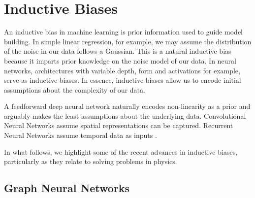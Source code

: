\documentclass{article}
\begin{document}
\section{Inductive Biases}

An inductive bias in machine learning is prior information used to guide model building. In simple linear regression, for example, we may assume the distribution of the noise in our data follows a Gaussian. This is a natural inductive bias because it imparts prior knowledge on the noise model of our data. In neural networks, architectures with variable depth, form and activations for example, serve as inductive biases. In essence, inductive biases allow us to encode initial assumptions about the complexity of our data.

A feedforward deep neural network naturally encodes non-linearity as a prior and arguably makes the least assumptions about the underlying data. Convolutional Neural Networks assume spatial representations can be captured. Recurrent Neural Networks assume temporal data as inputs \cite{battaglia_relational_2018}.

In what follows, we highlight some of the recent advances in inductive biases, particularly as they relate to solving problems in physics.

\subsection{Graph Neural Networks}
\end{document}
